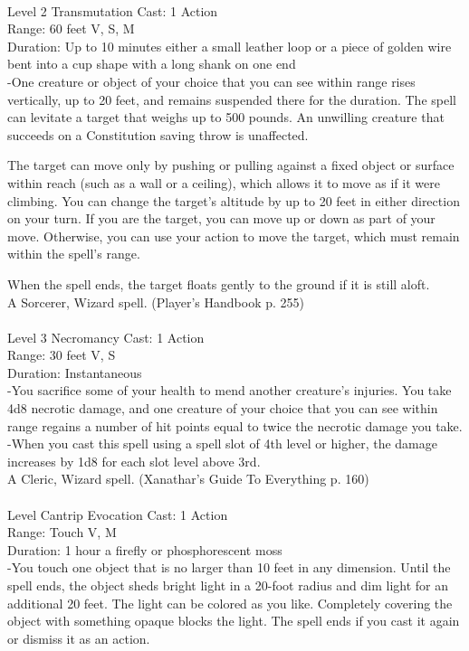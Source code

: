 \documentclass[10pt,twocolumn]{report}
\begin{document}
 \\
Level 2 \quad Transmutation \quad Cast: 1 Action\\
Range: 60 feet \quad V, S, M\\
Duration: Up to 10 minutes \quad either a small leather loop or a piece of golden wire bent into a cup shape with a long shank on one end\\
-One creature or object of your choice that you can see within range rises vertically, up to 20 feet, and remains suspended there for the duration. The spell can levitate a target that weighs up to 500 pounds. An unwilling creature that succeeds on a Constitution saving throw is unaffected.

The target can move only by pushing or pulling against a fixed object or surface within reach (such as a wall or a ceiling), which allows it to move as if it were climbing. You can change the target’s altitude by up to 20 feet in either direction on your turn. If you are the target, you can move up or down as part of your move. Otherwise, you can use your action to move the target, which must remain within the spell’s range.

When the spell ends, the target floats gently to the ground if it is still aloft.\\
A Sorcerer, Wizard spell. (Player's Handbook p. 255) \\


 \\
Level 3 \quad Necromancy \quad Cast: 1 Action\\
Range: 30 feet \quad V, S\\
Duration: Instantaneous \quad \\
-You sacrifice some of your health to mend another creature’s injuries. You take 4d8 necrotic damage, and one creature of your choice that you can see within range regains a number of hit points equal to twice the necrotic damage you take.\\
-When you cast this spell using a spell slot of 4th level or higher, the damage increases by 1d8 for each slot level above 3rd.\\
A Cleric, Wizard spell. (Xanathar's Guide To Everything p. 160) \\


 \\
Level Cantrip \quad Evocation \quad Cast: 1 Action\\
Range: Touch \quad V, M\\
Duration: 1 hour \quad a firefly or phosphorescent moss\\
-You touch one object that is no larger than 10 feet in any dimension. Until the spell ends, the object sheds bright light in a 20-foot radius and dim light for an additional 20 feet. The light can be colored as you like. Completely covering the object with something opaque blocks the light. The spell ends if you cast it again or dismiss it as an action.
\end{document}

